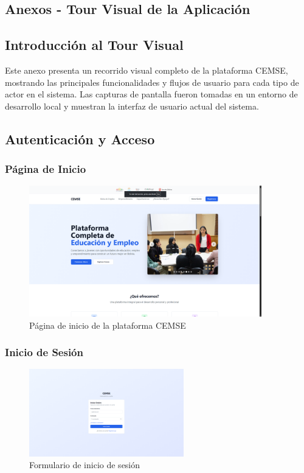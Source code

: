 \documentclass[12pt,a4paper]{article}
\begin{document}
\begin{enumerate}
\section{Anexos - Tour Visual de la Aplicación}

\subsection{Introducción al Tour Visual}

Este anexo presenta un recorrido visual completo de la plataforma CEMSE, mostrando las principales funcionalidades y flujos de usuario para cada tipo de actor en el sistema. Las capturas de pantalla fueron tomadas en un entorno de desarrollo local y muestran la interfaz de usuario actual del sistema.

\subsection{Autenticación y Acceso}

\subsubsection{Página de Inicio}
\begin{figure}[H]
    \centering
    \includegraphics[width=0.9\textwidth]{screenshots/auth/landing-page.png}
    \caption{Página de inicio de la plataforma CEMSE}
    \label{fig:landing-page}
\end{figure}

\subsubsection{Inicio de Sesión}
\begin{figure}[H]
    \centering
    \includegraphics[width=0.6\textwidth]{screenshots/auth/sign-in.png}
    \caption{Formulario de inicio de sesión}
    \label{fig:sign-in}
\end{figure}


\end{enumerate}
\end{document}
